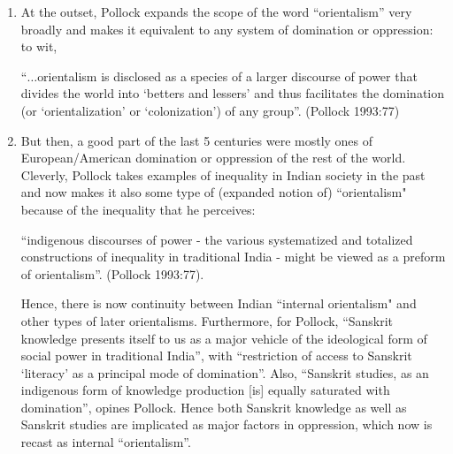 {\renewcommand\theenumi{\Alph{enumi}}
\renewcommand\labelenumi{{\bf\theenumi.}}
\begin{enumerate}
\item At the outset, Pollock expands the scope of the word “orientalism” very broadly and makes it equivalent to any system of domination or oppression: to wit, 
\begin{myquote}
“$\ldots$orientalism is disclosed as a species of a larger discourse of power that divides the world into ‘betters and lessers’ and thus facilitates the domination (or ‘orientalization’ or ‘colonization’) of any group”. \hfill(Pollock 1993:77)
\end{myquote}

\item But then, a good part of the last 5 centuries were mostly ones of European/American domination or oppression of the rest of the world. Cleverly, Pollock takes examples of inequality in Indian society in the past and now makes it also some type of (expanded notion of) ``orientalism" because of the inequality that he perceives:
\begin{myquote}
“indigenous discourses of power - the various systematized and totalized constructions of inequality in traditional India - might be viewed as a preform of orientalism”. \hfill(Pollock 1993:77).
\end{myquote}

Hence, there is now continuity between Indian ``internal orientalism" and other types of later orientalisms. Furthermore, for Pollock, “Sanskrit knowledge presents itself to us as a major vehicle of the ideological form of social power in traditional India”, with “restriction of access to Sanskrit ‘literacy’ as a principal mode of domination”. Also, “Sanskrit studies, as an indigenous form of knowledge production [is] equally saturated with domination”, opines Pollock. Hence both Sanskrit knowledge as well as Sanskrit studies are implicated as major factors in oppression, which now is recast as internal “orientalism”.


\end{enumerate}}
